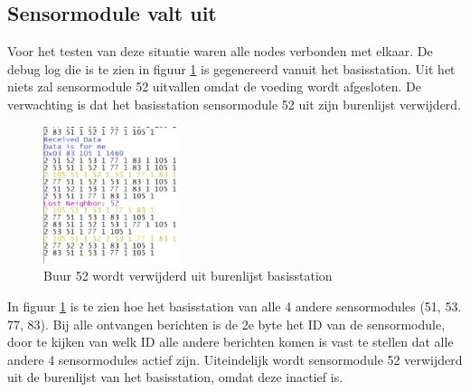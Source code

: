 \documentclass[a4paper, 11pt]{article}
\begin{document}
\subsection{Sensormodule valt uit} \label{ValtUit}
Voor het testen van deze situatie waren alle nodes verbonden met elkaar. De debug log die is te zien in figuur \ref{NodeValtUit} is gegenereerd vanuit het basisstation. Uit het niets zal sensormodule 52 uitvallen omdat de voeding wordt afgesloten. De verwachting is dat het basisstation sensormodule 52 uit zijn burenlijst verwijderd.
\begin{figure}[h!]
	\centering
	\includegraphics[width=4cm]{TestResults/NodeValtUit/NodeValtWeg_klein.png}
	\caption{Buur 52 wordt verwijderd uit burenlijst basisstation} \label{NodeValtUit}
\end{figure}
In figuur \ref{NodeValtUit} is te zien hoe het basisstation van alle 4 andere sensormodules (51, 53. 77, 83). Bij alle ontvangen berichten is de 2e byte het ID van de sensormodule, door te kijken van welk ID alle andere berichten komen is vast te stellen dat alle andere 4 sensormodules actief zijn. Uiteindelijk wordt sensormodule 52 verwijderd uit de burenlijst van het basisstation, omdat deze inactief is.
\end{document}
